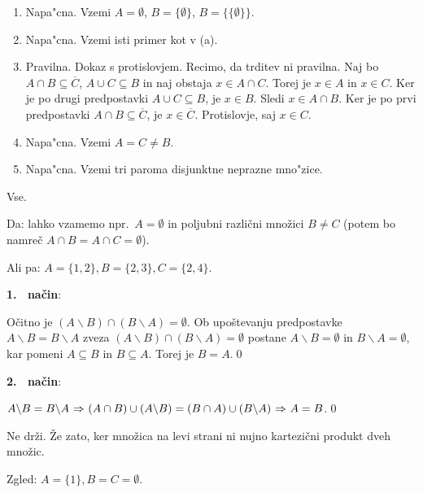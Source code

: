 \begin{answer}{2.9}
\begin{enumerate}
\item Napa"cna. Vzemi $A=\emptyset$, $B=\{\emptyset\}$, $B=\{\{\emptyset\}\}$.
\item Napa"cna. Vzemi isti primer kot v (a).
\item Pravilna. Dokaz s protislovjem. Recimo, da trditev ni pravilna. Naj bo $A\cap B\subseteq \overline{C}$, $A\cup C\subseteq B$  in naj obstaja $x\in A\cap C$. Torej je $x\in A$ in $x\in C$. Ker je po drugi predpostavki $A\cup C\subseteq B$, je $x\in B$. Sledi $x\in A \cap B$. Ker je po prvi predpostavki $A\cap B\subseteq \overline{C}$, je $x\in \overline{C}$. Protislovje, saj $x\in C$.
\item Napa"cna. Vzemi $A=C\neq B$.
\item Napa"cna. Vzemi tri paroma disjunktne neprazne mno"zice.
\end{enumerate}
\end{answer}
\begin{answer}{2}
    Vse.
\end{answer}
\begin{answer}{2}
    Da: lahko vzamemo npr.~$A = \emptyset$ in poljubni različni množici $B\neq C$
(potem bo namreč $A\cap B = A\cap C = \emptyset$).

Ali pa: $A = \{1,2\}, B = \{2,3\}, C = \{2,4\}$.
\end{answer}
\begin{answer}{2}
\textbf{1.~ način}:

Očitno je
$(A\backslash B) \cap (B\backslash A)=\emptyset$.
Ob upoštevanju predpostavke $A\backslash B = B\backslash A$
zveza
$(A\backslash B) \cap (B\backslash A)=\emptyset$
postane
$A\backslash B =\emptyset$
in $B\backslash A =\emptyset$, kar pomeni
$A\subseteq B$ in $B\subseteq A$. Torej je $B = A$.\qed

\textbf{2.~ način}:

$A\backslash B = B\backslash A {~\Rightarrow~}(A\cap B)\cup (A\backslash B) = (B\cap A)\cup (B\backslash A) {~\Rightarrow~} A = B$.\qed
\end{answer}
\begin{answer}{2}
Ne drži. Že zato, ker množica na levi strani ni nujno kartezični produkt dveh množic.

Zgled: $A = \{1\}, B = C = \emptyset$.

\end{answer}
